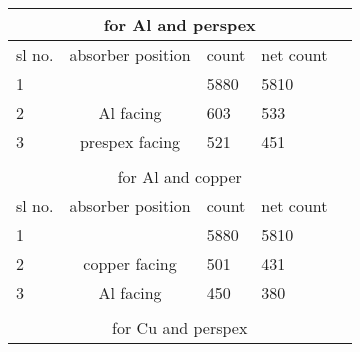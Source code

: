 \begin{table}[H]
\begin{tabular}{|lcllll|}
\hline
\multicolumn{6}{|c|}{for   Al and perspex}                                                                                                    \\ \hline
\multicolumn{1}{|l|}{sl no.} & \multicolumn{2}{c|}{absorber position}        & \multicolumn{1}{l|}{count} & \multicolumn{1}{l|}{net count} &  \\ \hline
\multicolumn{1}{|l|}{1}      & \multicolumn{2}{c|}{}                         & \multicolumn{1}{l|}{5880}  & \multicolumn{1}{l|}{5810}      &  \\ \hline
\multicolumn{1}{|l|}{2}      & \multicolumn{2}{c|}{Al facing}           & \multicolumn{1}{l|}{603}   & \multicolumn{1}{l|}{533}       &  \\ \hline
\multicolumn{1}{|l|}{3}      & \multicolumn{2}{c|}{prespex facing}                & \multicolumn{1}{l|}{521}   & \multicolumn{1}{l|}{451}       &  \\ \hline
\multicolumn{1}{|l|}{}       & \multicolumn{1}{l|}{} & \multicolumn{1}{l|}{} & \multicolumn{1}{l|}{}      & \multicolumn{1}{l|}{}          &  \\ \hline
\multicolumn{6}{|c|}{for Al and copper}                                                                                                       \\ \hline
\multicolumn{1}{|l|}{sl no.} & \multicolumn{2}{c|}{absorber position}        & \multicolumn{1}{l|}{count} & \multicolumn{1}{l|}{net count} &  \\ \hline
\multicolumn{1}{|l|}{1}      & \multicolumn{2}{c|}{}                         & \multicolumn{1}{l|}{5880}  & \multicolumn{1}{l|}{5810}      &  \\ \hline
\multicolumn{1}{|l|}{2}      & \multicolumn{2}{c|}{copper facing}            & \multicolumn{1}{l|}{501}   & \multicolumn{1}{l|}{431}       &  \\ \hline
\multicolumn{1}{|l|}{3}      & \multicolumn{2}{c|}{Al facing}                & \multicolumn{1}{l|}{450}   & \multicolumn{1}{l|}{380}       &  \\ \hline
\multicolumn{1}{|l|}{}       & \multicolumn{1}{l|}{} & \multicolumn{1}{l|}{} & \multicolumn{1}{l|}{}      & \multicolumn{1}{l|}{}          &  \\ \hline
\multicolumn{6}{|c|}{for Cu and perspex}                                                                                                      \\ \hline

\end{tabular}
\end{table}

